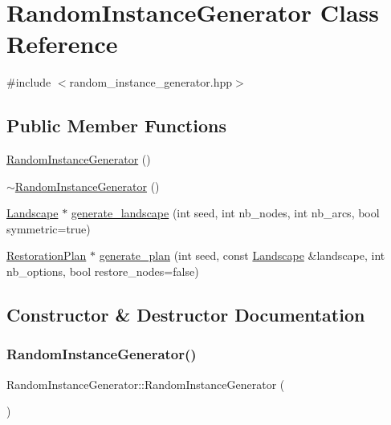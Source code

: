 \hypertarget{class_random_instance_generator}{}\section{Random\+Instance\+Generator Class Reference}
\label{class_random_instance_generator}


{\ttfamily \#include $<$random\+\_\+instance\+\_\+generator.\+hpp$>$}

\subsection*{Public Member Functions}
\begin{DoxyCompactItemize}
\item 
\hyperlink{class_random_instance_generator_accbd822dbe0ec314283b205685f3b948}{Random\+Instance\+Generator} ()
\item 
\hyperlink{class_random_instance_generator_a035ccd182dd67b8de261a3535a0ef9cd}{$\sim$\+Random\+Instance\+Generator} ()
\item 
\hyperlink{class_landscape}{Landscape} $\ast$ \hyperlink{class_random_instance_generator_a68c1cb5697b42b9376161c80640a181c}{generate\+\_\+landscape} (int seed, int nb\+\_\+nodes, int nb\+\_\+arcs, bool symmetric=true)
\item 
\hyperlink{class_restoration_plan}{Restoration\+Plan} $\ast$ \hyperlink{class_random_instance_generator_ac83fffb7a2f2d93d7b3fd28a448e450c}{generate\+\_\+plan} (int seed, const \hyperlink{class_landscape}{Landscape} \&landscape, int nb\+\_\+options, bool restore\+\_\+nodes=false)
\end{DoxyCompactItemize}


\subsection{Constructor \& Destructor Documentation}
\mbox{\label{class_random_instance_generator_accbd822dbe0ec314283b205685f3b948}} 
\subsubsection{\texorpdfstring{Random\+Instance\+Generator()}{RandomInstanceGenerator()}}
{\footnotesize\ttfamily Random\+Instance\+Generator\+::\+Random\+Instance\+Generator (\begin{DoxyParamCaption}{ }\end{DoxyParamCaption})\hspace{0.3cm}{\ttfamily [inline]}}

